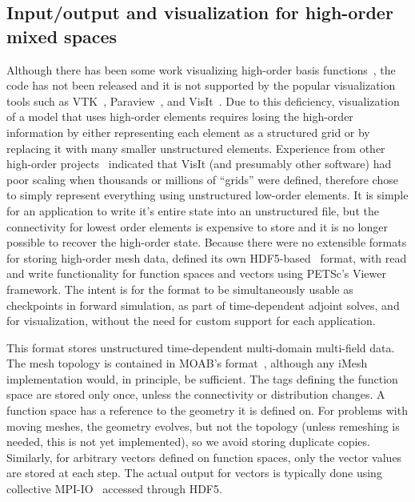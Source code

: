 \subsection{Input/output and visualization for high-order mixed spaces}
Although there has been some work visualizing high-order basis functions~\citep{schroeder2005framework,schroeder2006methods,ueffinger2010interactive}, the code has not been released and it is not supported by the popular visualization tools such as VTK~\citep{schroeder1998visualization}, Paraview~\citep{henderson2004paraview}, and VisIt~\citep{childs2006beyond}.
Due to this deficiency, visualization of a model that uses high-order elements requires losing the high-order information by either representing each element as a structured grid or by replacing it with many smaller unstructured elements.
Experience from other high-order projects~\citep{fischer2008nek5000} indicated that VisIt (and presumably other software) had poor scaling when thousands or millions of ``grids'' were defined, therefore {\Dohp} chose to simply represent everything using unstructured low-order elements.
It is simple for an application to write it's entire state into an unstructured file, but the connectivity for lowest order elements is expensive to store and it is no longer possible to recover the high-order state.
Because there were no extensible formats for storing high-order mesh data, {\Dohp} defined its own HDF5-based~\citep{hdf5} format, with read and write functionality for function spaces and vectors using PETSc's Viewer framework.
The intent is for the format to be simultaneously usable as checkpoints in forward simulation, as part of time-dependent adjoint solves, and for visualization, without the need for custom support for each application.

This format stores unstructured time-dependent multi-domain multi-field data.
The mesh topology is contained in MOAB's format~\citep{moab}, although any iMesh implementation would, in principle, be sufficient.
The tags defining the function space are stored only once, unless the connectivity or distribution changes.
A function space has a reference to the geometry it is defined on.
For problems with moving meshes, the geometry evolves, but not the topology (unless remeshing is needed, this is not yet implemented), so we avoid storing duplicate copies.
Similarly, for arbitrary vectors defined on function spaces, only the vector values are stored at each step.
The actual output for vectors is typically done using collective MPI-IO~\citep{corbett1995overview} accessed through HDF5.


